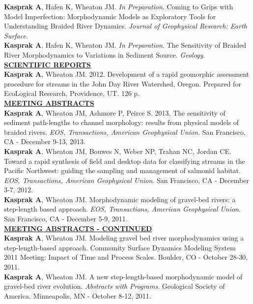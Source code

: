 \documentclass{article}
\begin{document}
\noindent \textbf{Kasprak A}, Hafen K, Wheaton JM. \textit{In Preparation}. Coming to Grips with Model Imperfection: Morphodynamic Models as Exploratory Tools for Understanding Braided River Dynamics. \textit{Journal of Geophysical Research: Earth Surface.}\\

\noindent \textbf{Kasprak A}, Hafen K, Wheaton JM. \textit{In Preparation}. The Sensitivity of Braided River Morphodynamics to Variations in Sediment Source. \textit{Geology}.\\

\noindent \textbf{\underline{SCIENTIFIC REPORTS}}\\
\textbf{Kasprak A}, Wheaton JM. 2012. Development of a rapid geomorphic assessment procedure for streams in the John Day River Watershed, Oregon. Prepared for EcoLogical Research, Providence, UT. 126 p.\\

\noindent \textbf{\underline{MEETING ABSTRACTS}}\\
\noindent \textbf{Kasprak A}, Wheaton JM, Ashmore P, Peirce S. 2013. The sensitivity of sediment path-lengths to channel morphology: results from physical models of braided rivers. \textit{EOS, Transactions, American Geophysical Union}. San Francisco, CA - December 9-13, 2013.\\

\noindent \textbf{Kasprak A}, Wheaton JM, Bouwes N, Weber NP, Trahan NC, Jordan CE. Toward a rapid synthesis of field and desktop data for classifying streams in the Pacific Northwest: guiding the sampling and management of salmonid habitat. \textit{EOS, Transactions, American Geophysical Union}. San Francisco, CA - December 3-7, 2012.\\

\noindent \textbf{Kasprak A}, Wheaton JM. Morphodynamic modeling of gravel-bed rivers: a step-length based approach. \textit{EOS, Transactions, American Geophysical Union}. San Francisco, CA - December 5-9, 2011.\\

\noindent \textbf{\underline{MEETING ABSTRACTS - CONTINUED}}\\
\noindent \textbf{Kasprak A}, Wheaton JM. Modeling gravel bed river morphodynamics using a step-length-based approach. Community Surface Dynamics Modeling System 2011 Meeting: Impact of Time and Process Scales. Boulder, CO - October 28-30, 2011.\\

\noindent \textbf{Kasprak A}, Wheaton JM. A new step-length-based morphodynamic model of gravel-bed river evolution. \textit{Abstracts with Programs}. Geological Society of America. Minneapolis, MN - October 8-12, 2011.\\
\end{document}
